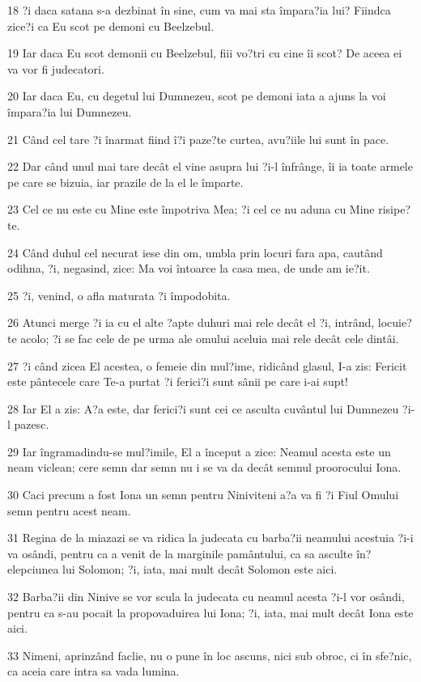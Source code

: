 \par 18 ?i daca satana s-a dezbinat în sine, cum va mai sta împara?ia lui? Fiindca zice?i ca Eu scot pe demoni cu Beelzebul.
\par 19 Iar daca Eu scot demonii cu Beelzebul, fiii vo?tri cu cine îi scot? De aceea ei va vor fi judecatori.
\par 20 Iar daca Eu, cu degetul lui Dumnezeu, scot pe demoni iata a ajuns la voi împara?ia lui Dumnezeu.
\par 21 Când cel tare ?i înarmat fiind î?i paze?te curtea, avu?iile lui sunt în pace.
\par 22 Dar când unul mai tare decât el vine asupra lui ?i-l înfrânge, îi ia toate armele pe care se bizuia, iar prazile de la el le împarte.
\par 23 Cel ce nu este cu Mine este împotriva Mea; ?i cel ce nu aduna cu Mine risipe?te.
\par 24 Când duhul cel necurat iese din om, umbla prin locuri fara apa, cautând odihna, ?i, negasind, zice: Ma voi întoarce la casa mea, de unde am ie?it.
\par 25 ?i, venind, o afla maturata ?i împodobita.
\par 26 Atunci merge ?i ia cu el alte ?apte duhuri mai rele decât el ?i, intrând, locuie?te acolo; ?i se fac cele de pe urma ale omului aceluia mai rele decât cele dintâi.
\par 27 ?i când zicea El acestea, o femeie din mul?ime, ridicând glasul, I-a zis: Fericit este pântecele care Te-a purtat ?i ferici?i sunt sânii pe care i-ai supt!
\par 28 Iar El a zis: A?a este, dar ferici?i sunt cei ce asculta cuvântul lui Dumnezeu ?i-l pazesc.
\par 29 Iar îngramadindu-se mul?imile, El a început a zice: Neamul acesta este un neam viclean; cere semn dar semn nu i se va da decât semnul proorocului Iona.
\par 30 Caci precum a fost Iona un semn pentru Niniviteni a?a va fi ?i Fiul Omului semn pentru acest neam.
\par 31 Regina de la miazazi se va ridica la judecata cu barba?ii neamului acestuia ?i-i va osândi, pentru ca a venit de la marginile pamântului, ca sa asculte în?elepciunea lui Solomon; ?i, iata, mai mult decât Solomon este aici.
\par 32 Barba?ii din Ninive se vor scula la judecata cu neamul acesta ?i-l vor osândi, pentru ca s-au pocait la propovaduirea lui Iona; ?i, iata, mai mult decât Iona este aici.
\par 33 Nimeni, aprinzând faclie, nu o pune în loc ascuns, nici sub obroc, ci în sfe?nic, ca aceia care intra sa vada lumina.
